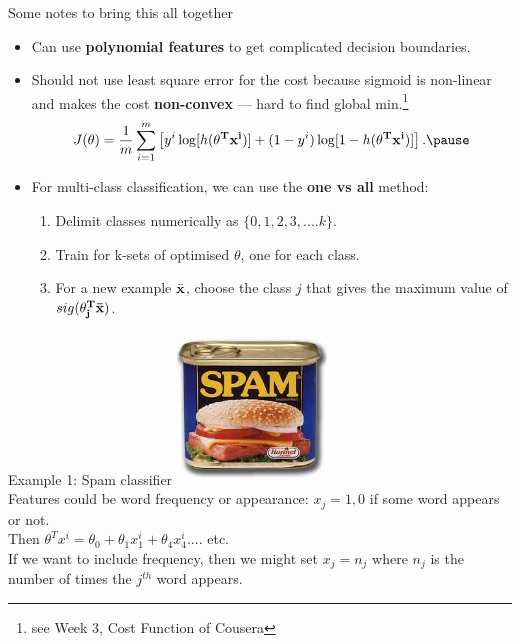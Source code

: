 \documentclass[usenames,dvipsnames]{beamer}
\begin{document}
\begin{frame}
Some notes to  bring this all together 
\begin{itemize}
\item
Can use {\bf polynomial features} to get complicated decision boundaries.  \pause 
\item
Should not use least square error for the cost because sigmoid is non-linear and makes the cost {\bf non-convex} --- hard to find global min.\footnote{see Week 3, Cost Function of Cousera}
\begin{equation}
J(\theta) = \frac{1}{m} \sum_{i=1}^m \left[ y^i \log[h({\bf \theta^T x^i})] + (1-y^i)\log[1-h({\bf \theta^T x^i})] \right]. \pause
\end{equation}
\item
For multi-class classification, we can use the {\bf one vs all} method: 
\begin{enumerate}
\item
Delimit classes numerically as $\{0,1,2,3, .... k\}$.
\item
Train for k-sets of optimised $\theta$, one for each class.
\item
 For a new example $\bar{\bf x}$, choose the class $j$ that gives the maximum value of $sig({\bf \theta^T_j \bar{\bf x}})$.
 \end{enumerate}
\end{itemize}
\end{frame}

\begin{frame}{Example 1: Spam classifier} 
\centering
    \includegraphics[width=4cm,height=4cm]{figs/spam.jpeg} \\  \pause
Features could be word frequency or appearance:  $x_j = 1,0$ if some word appears or not. \\
Then $\theta^T x^i = \theta_0 + \theta_1 x_1^i + \theta_4 x_4^i .... $ etc. \\ \pause
If we want to include frequency, then we might set $x_j = n_j$ where $n_j$ is the number of times the $j^{th}$ word appears. 

\end{frame}
\end{document}
